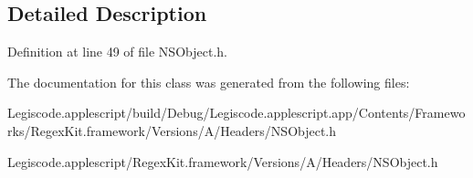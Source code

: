 \subsection{Detailed Description}


Definition at line 49 of file N\-S\-Object.\-h.



The documentation for this class was generated from the following files\-:\begin{DoxyCompactItemize}
\item 
Legiscode.\-applescript/build/\-Debug/\-Legiscode.\-applescript.\-app/\-Contents/\-Frameworks/\-Regex\-Kit.\-framework/\-Versions/\-A/\-Headers/N\-S\-Object.\-h\item 
Legiscode.\-applescript/\-Regex\-Kit.\-framework/\-Versions/\-A/\-Headers/N\-S\-Object.\-h\end{DoxyCompactItemize}

